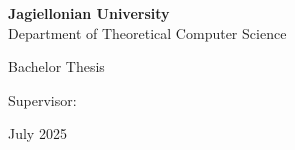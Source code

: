 \begin{titlepage}
\begin{center}

    \Large
    \textbf{Jagiellonian University} \\
    Department of Theoretical Computer Science \\
    
    \vspace{5cm}
    
    \Me
    
    \vspace{2cm}
    
    \begin{spacing}{2}
        { \huge\textbf{\Title} }
    \end{spacing}
    
    \vfill
    
    Bachelor Thesis
    
    Supervisor: \Supervisor
    
    \vspace{0.8cm}
    
    July 2025
		
\end{center}
\end{titlepage}